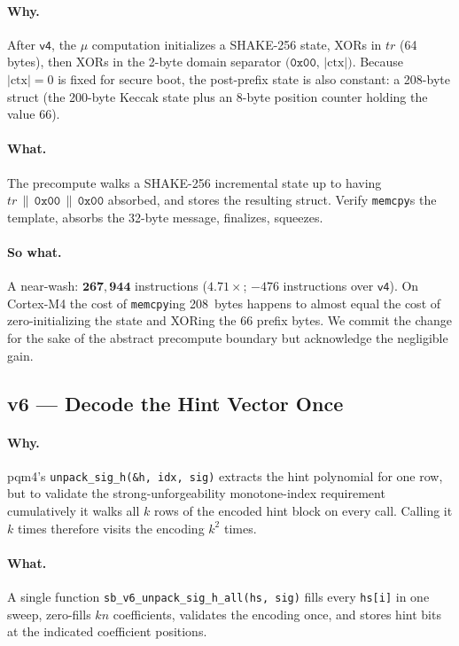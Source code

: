 \documentclass[11pt,a4paper]{article}
\begin{document}
\paragraph{Why.} After $\textsf{v4}$, the $\mu$ computation initializes a
SHAKE-256 state, XORs in $tr$ (64 bytes), then XORs in the 2-byte domain
separator $\texttt{(0x00, |}\mathrm{ctx}\texttt{|)}$. Because
$|\mathrm{ctx}| = 0$ is fixed for secure boot, the post-prefix state is
also constant: a 208-byte struct (the 200-byte Keccak state plus an
8-byte position counter holding the value 66).

\paragraph{What.} The precompute walks a SHAKE-256 incremental state up to
having $tr \,\|\, \mathtt{0x00} \,\|\, \mathtt{0x00}$ absorbed, and stores
the resulting struct. Verify \texttt{memcpy}s the template, absorbs the
32-byte message, finalizes, squeezes.

\paragraph{So what.} A near-wash: $\mathbf{267{,}944}$ instructions
($\mathbf{4.71\times}$; $-476$ instructions over $\textsf{v4}$). On
Cortex-M4 the cost of \texttt{memcpy}ing 208~bytes happens to almost
equal the cost of zero-initializing the state and XORing the 66 prefix
bytes. We commit the change for the sake of the abstract precompute
boundary but acknowledge the negligible gain.

\subsection{v6 --- Decode the Hint Vector Once}

\paragraph{Why.} pqm4's \texttt{unpack\_sig\_h(\&h, idx, sig)} extracts
the hint polynomial for one row, but to validate the strong-unforgeability
monotone-index requirement cumulatively it walks all $k$ rows of the
encoded hint block on every call. Calling it $k$ times therefore visits
the encoding $k^2$ times.

\paragraph{What.} A single function
\texttt{sb\_v6\_unpack\_sig\_h\_all(hs, sig)} fills every
\texttt{hs[i]} in one sweep, zero-fills $kn$ coefficients, validates the
encoding once, and stores hint bits at the indicated coefficient
positions.
\end{document}
